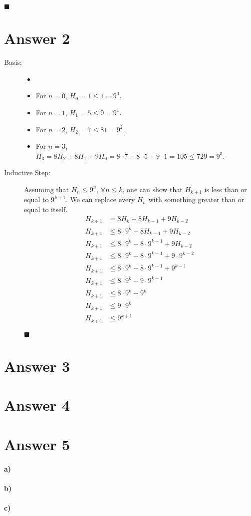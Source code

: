 \documentclass[12pt]{article}
\newcommand{\+}{\mkern2mu}
\newcommand{\uq}[1]{\forall #1}
\begin{document}
\begin{description}
    \hfill $\blacksquare$
\end{description}

\newpage

\section*{Answer 2}

\begin{description}
    \item[Basis:]
    \begin{itemize}
        \item[]
        \item For $n = 0$, $H_0 = 1 \leq 1 = 9^0$.
        \item For $n = 1$, $H_1 = 5 \leq 9 = 9^1$.
        \item For $n = 2$, $H_2 = 7 \leq 81 = 9^2$.
        \item For $n = 3$, $H_3 = 8H_2 + 8H_1 + 9H_0 = 8 \cdot 7 + 8 \cdot 5 + 9 \cdot 1 = 105 \leq 729 = 9^3$.
    \end{itemize}
    \item[Inductive Step:] Assuming that $H_n \leq 9^n$, $\uq{n} \leq k$, one can show that $H_{k+1}$ is less than or equal to $9^{k+1}$. We can replace every $H_n$ with something greater than or equal to itself.
    \begin{align*}
        H_{k+1} &= 8H_k + 8H_{k-1} + 9H_{k-2} \\
        H_{k+1} &\leq 8 \cdot 9^k + 8H_{k-1} + 9H_{k-2} \\
        H_{k+1} &\leq 8 \cdot 9^k + 8 \cdot 9^{k-1} + 9H_{k-2} \\
        H_{k+1} &\leq 8 \cdot 9^k + 8 \cdot 9^{k-1} + 9 \cdot 9^{k-2} \\
        H_{k+1} &\leq 8 \cdot 9^k + 8 \cdot 9^{k-1} + 9^{k-1} \\
        H_{k+1} &\leq 8 \cdot 9^k + 9 \cdot 9^{k-1} \\
        H_{k+1} &\leq 8 \cdot 9^k + 9^{k} \\
        H_{k+1} &\leq 9 \cdot 9^k \\
        H_{k+1} &\leq 9^{k+1}
    \end{align*}

    \hfill $\blacksquare$
\end{description}

\section*{Answer 3}

\section*{Answer 4}

\section*{Answer 5}
\paragraph{a)}
\paragraph{b)}
\paragraph{c)}
\end{document}
